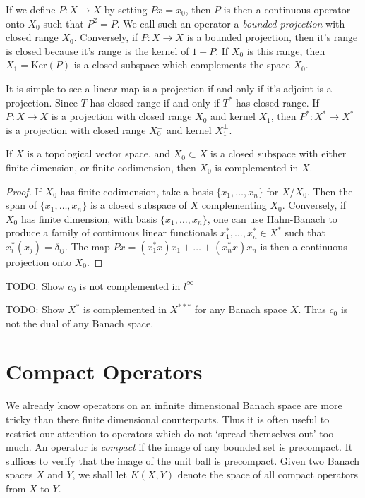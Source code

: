If we define $P: X \to X$ by setting $Px = x_0$, then $P$ is then a continuous operator onto $X_0$ such that $P^2 = P$. We call such an operator a \emph{bounded projection} with closed range $X_0$. Conversely, if $P: X \to X$ is a bounded projection, then it's range is closed because it's range is the kernel of $1 - P$. If $X_0$ is this range, then $X_1 = \text{Ker}(P)$ is a closed subspace which complements the space $X_0$.

It is simple to see a linear map is a projection if and only if it's adjoint is a projection. Since $T$ has closed range if and only if $T^*$ has closed range. If $P: X \to X$ is a projection with closed range $X_0$ and kernel $X_1$, then $P^*: X^* \to X^*$ is a projection with closed range $X_0^\perp$ and kernel $X_1^\perp$.

\begin{theorem}
    If $X$ is a topological vector space, and $X_0 \subset X$ is a closed subspace with either finite dimension, or finite codimension, then $X_0$ is complemented in $X$.
\end{theorem}
\begin{proof}
    If $X_0$ has finite codimension, take a basis $\{ x_1, \dots, x_n \}$ for $X/X_0$. Then the span of $\{ x_1, \dots, x_n \}$ is a closed subspace of $X$ complementing $X_0$. Conversely, if $X_0$ has finite dimension, with basis $\{ x_1, \dots, x_n \}$, one can use Hahn-Banach to produce a family of continuous linear functionals $x_1^*, \dots, x_n^* \in X^*$ such that $x_i^*(x_j) = \delta_{ij}$. The map $Px = (x_1^* x) x_1 + \dots + (x_n^* x) x_n$ is then a continuous projection onto $X_0$.
\end{proof}

TODO: Show $c_0$ is not complemented in $l^\infty$

TODO: Show $X^*$ is complemented in $X^{***}$ for any Banach space $X$. Thus $c_0$ is not the dual of any Banach space.






\section{Compact Operators}

We already know operators on an infinite dimensional Banach space are more tricky than there finite dimensional counterparts. Thus it is often useful to restrict our attention to operators which do not `spread themselves out' too much. An operator is \emph{compact} if the image of any bounded set is precompact. It suffices to verify that the image of the unit ball is precompact. Given two Banach spaces $X$ and $Y$, we shall let $K(X,Y)$ denote the space of all compact operators from $X$ to $Y$.

